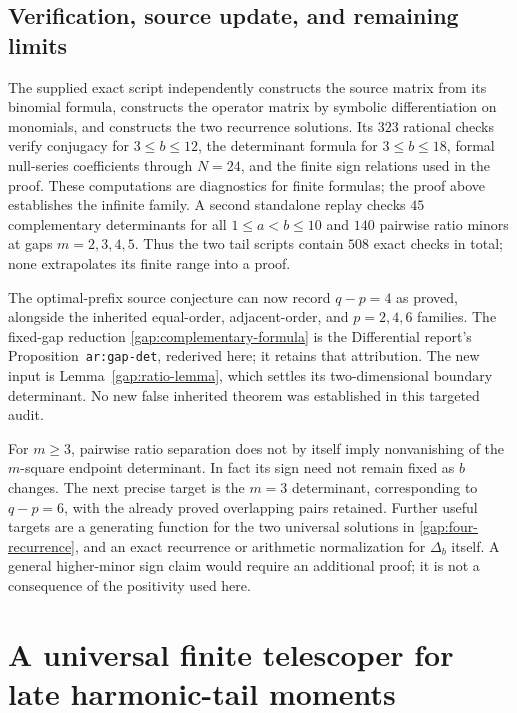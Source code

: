 \documentclass[11pt,letterpaper]{article}
\numberwithin{equation}{section}
\theoremstyle{plain}
\theoremstyle{definition}
\theoremstyle{remark}
\begin{document}
\subsection{Verification, source update, and remaining limits}

The supplied exact script independently constructs the source matrix
from its binomial formula, constructs the operator matrix by symbolic
differentiation on monomials, and constructs the two recurrence
solutions. Its $323$ rational checks verify conjugacy for
$3\le b\le12$, the determinant formula for $3\le b\le18$,
formal null-series coefficients through $N=24$, and the finite sign
relations used in the proof. These computations are diagnostics for
finite formulas; the proof above establishes the infinite family.
A second standalone replay checks $45$ complementary determinants
for all $1\le a<b\le10$ and $140$ pairwise ratio minors at gaps
$m=2,3,4,5$. Thus the two tail scripts contain $508$ exact checks
in total; none extrapolates its finite range into a proof.

The optimal-prefix source conjecture can now record $q-p=4$ as
proved, alongside the inherited equal-order, adjacent-order, and
$p=2,4,6$ families. The fixed-gap reduction
\eqref{gap:complementary-formula} is the Differential report's
Proposition~\texttt{ar:gap-det}, rederived here; it retains that
attribution. The new input is Lemma~\ref{gap:ratio-lemma}, which
settles its two-dimensional boundary determinant. No new false
inherited theorem was established in this targeted audit.

For $m\ge3$, pairwise ratio separation does not by itself imply
nonvanishing of the $m$-square endpoint determinant. In fact its
sign need not remain fixed as $b$ changes. The next precise target
is the $m=3$ determinant, corresponding to $q-p=6$, with the
already proved overlapping pairs retained. Further useful targets
are a generating function for the two universal solutions in
\eqref{gap:four-recurrence}, and an exact recurrence or arithmetic
normalization for $\Delta_b$ itself. A general higher-minor sign
claim would require an additional proof; it is not a consequence
of the positivity used here.


\section{A universal finite telescoper for late harmonic-tail moments}
\label{tel:section}
\end{document}
